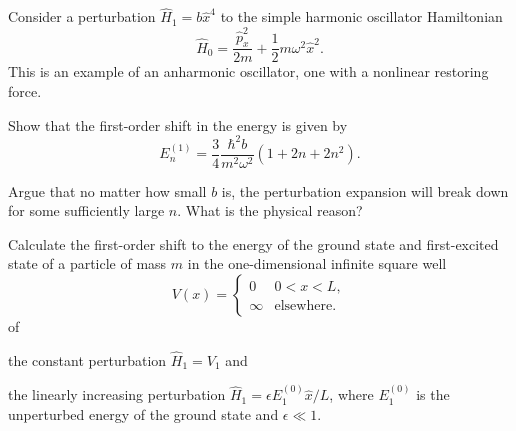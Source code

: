 \documentclass {../phys116}
\begin{document}
\begin {exercise} 
  Consider a perturbation \(\hat H_1 = b \hat x^4\) to the simple
  harmonic oscillator Hamiltonian
  \[
    \hat H_0
    = \frac {\hat p_x^2} {2 m}
    + \frac 1 2 m \omega^2 \hat x^2.
  \]
  This is an example of an anharmonic oscillator, one with a nonlinear
  restoring force.
  \begin {problems}
  \item Show that the first-order shift in the energy is given by
    \[
      E_n^{(1)} = \frac 3 4 \frac {\hbar^2 b} {m^2 \omega^2} (1 + 2 n + 2 n^2).
    \]
  \item Argue that no matter how small \(b\) is, the perturbation
    expansion will break down for some sufficiently large \(n\).  What
    is the physical reason?
  \end {problems}
\end {exercise}

\begin {solution}

\end {solution}

\begin {exercise} 
  Calculate the first-order shift to the energy of the ground state
  and first-excited state of a particle of mass \(m\) in the
  one-dimensional infinite square well
  \[
    V(x) =
    \begin {cases}
      0 & 0 < x < L, \\
      \infty & \text {elsewhere}.
    \end {cases}
  \]
  of
  \begin {problems}
  \item the constant perturbation \(\hat H_1 = V_1\) and
  \item the linearly increasing perturbation
    \(\hat H_1 = \epsilon E_1^{(0)} \hat x / L\), where \(E_1^{(0)}\)
    is the unperturbed energy of the ground state and
    \(\epsilon \ll 1\).
  \end {problems}
\end {exercise}
\end{document}

